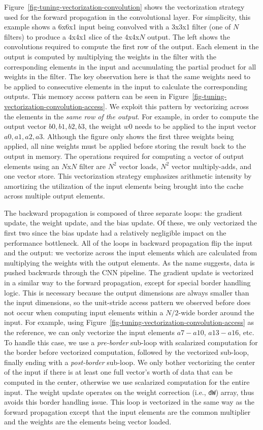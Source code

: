 Figure~\ref{fig-tuning-vectorization-convolution} shows the vectorization
strategy used for the forward propagation in the convolutional layer. For
simplicity, this example shows a 6x6x1 input being convolved with a 3x3x1
filter (one of $N$ filters) to produce a 4x4x1 slice of the 4x4x$N$
output. The left shows the convolutions required to compute the first row
of the output. Each element in the output is computed by multiplying the
weights in the filter with the corresponding elements in the input and
accumulating the partial product for all weights in the filter. The key
observation here is that the same weights need to be applied to
consecutive elements in the input to calculate the corresponding outputs.
This memory access pattern can be seen in
Figure~\ref{fig-tuning-vectorization-convolution-access}. We exploit this
pattern by vectorizing across the elements in the \emph{same row of the
  output}. For example,
in order to compute the output vector ${b0,b1,b2,b3}$, the weight $w0$
needs to be applied to the input vector ${a0,a1,a2,a3}$. Although the
figure only shows the first three weights being applied, all nine weights
must be applied before storing the result back to the output in
memory. The operations required for computing a vector of output elements
using an $N$x$N$ filter are $N^2$ vector loads, $N^2$ vector
multiply-adds, and one vector store. This vectorization strategy
emphasizes arithmetic intensity by amortizing the utilization of the
input elements being brought into the cache across multiple output
elements.

The backward propagation is composed of three separate loops: the
gradient update, the weight update, and the bias update. Of these, we
only vectorized the first two since the bias update had a relatively
negligible impact on the performance bottleneck. All of the loops in
backward propagation flip the input and the output: we vectorize across
the input elements which are calculated from multiplying the weights with
the output elements. As the name suggests, data is pushed backwards
through the CNN pipeline. The gradient update is vectorized in a similar
way to the forward propagation, except for special border handling
logic. This is necessary because the output dimensions are always smaller
than the input dimensions, so the unit-stride access pattern we observed
before does not occur when computing input elements within a $N/2$-wide
border around the input. For example, using
Figure~\ref{fig-tuning-vectorization-convolution-access} as the
reference, we can only vectorize the input elements $a7-a10$, $a13-a16$,
etc. To handle this case, we use a \emph{pre-border} sub-loop with
scalarized computation for the border before vectorized computation,
followed by the vectorized sub-loop, finally ending with a
\emph{post-border} sub-loop. We only bother vectorizing the center of the
input if there is at least one full vector's worth of data that can be
computed in the center, otherwise we use scalarized computation for the
entire input. The weight update operates on the weight correction (i.e.,
\texttt{dW}) array, thus avoids this border handling issue. This loop is
vectorized in the same way as the forward propagation except that the
input elements are the common multiplier and the weights are the elements
being vector loaded.

